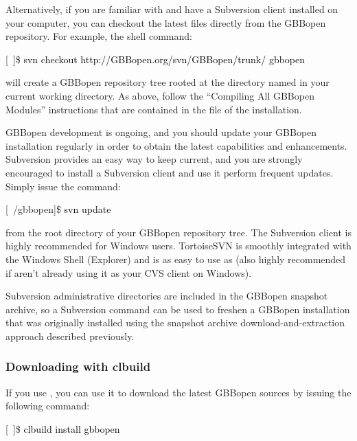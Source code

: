 \documentclass[10pt,twoside,english,pdftex]{article}
\begin{document}
%
%
Alternatively, if you are familiar with
 and have a Subversion
client installed on your computer, you can checkout the latest files directly
from the GBBopen repository.  For example, the shell command:
%
\W\supp
\begin{example}
\textcolor{darkergray}{%
  [~]\$ \textcolor{black}{svn checkout http://GBBopen.org/svn/GBBopen/trunk/ gbbopen}}
\end{example}
%
will create a GBBopen repository tree rooted at the directory named
 in your current working directory.  As above, follow the
``Compiling All GBBopen Modules'' instructions that are contained in the
 file of the installation.

%
%
%
%
%
GBBopen development is ongoing, and you should update your GBBopen
installation regularly in order to obtain the latest capabilities and
enhancements.  Subversion provides an easy way to keep current, and you are
strongly encouraged to install a Subversion client and use it perform frequent
updates.  Simply issue the command:
%
\W\supp
\begin{example}
\textcolor{darkergray}{%
  [~/gbbopen]\$ \textcolor{black}{svn update}}
\end{example}
%
from the root directory of your GBBopen repository tree.  
The  Subversion
client is highly recommended for Windows users.  TortoiseSVN is
smoothly integrated with the Windows Shell (Explorer) and is as easy
to use as  (also
highly recommended if aren't already using it as your CVS client on
Windows).

Subversion  administrative directories are included in the GBBopen
snapshot archive, so a Subversion  command can be used to freshen
a GBBopen installation that was originally installed using the snapshot
archive download-and-extraction approach described previously.

\subsubsection*{Downloading with clbuild}

%
%
If you use , you
can use it to download the latest GBBopen sources by issuing the following
command:
%
\W\supp
\begin{example}
\textcolor{darkergray}{%
  [~]\$ \textcolor{black}{clbuild install gbbopen}}
\end{example}
\end{document}
